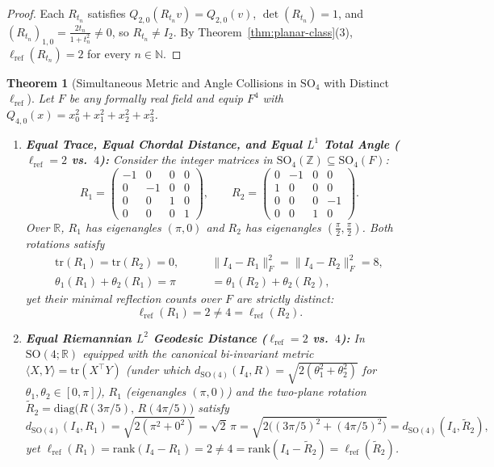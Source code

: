 \documentclass[11pt,a4paper]{article}
\theoremstyle{plain}
\newtheorem{theorem}{Theorem}[section]
\theoremstyle{definition}
\newcommand{\R}{\mathbb{R}}
\newcommand{\Z}{\mathbb{Z}}
\newcommand{\N}{\mathbb{N}}
\newcommand{\SO}{\mathrm{SO}}
\newcommand{\lref}{\ell_{\mathrm{ref}}}
\newcommand{\rk}{\mathrm{rank}}
\newcommand{\tr}{\mathrm{tr}}
\begin{document}
\begin{proof}
Each $R_{t_n}$ satisfies $Q_{2,0}(R_{t_n} v) = Q_{2,0}(v)$, $\det(R_{t_n}) = 1$, and $(R_{t_n})_{1,0} = \frac{2 t_n}{1 + t_n^2} \neq 0$, so $R_{t_n} \neq I_2$. By Theorem~\ref{thm:planar-class}(3), $\lref(R_{t_n}) = 2$ for every $n \in \N$.
\end{proof}

\begin{theorem}[Simultaneous Metric and Angle Collisions in $\SO_4$ with Distinct $\lref$]
\label{thm:so4-collision}
Let $F$ be any formally real field and equip $F^4$ with $Q_{4,0}(x) = x_0^2 + x_1^2 + x_2^2 + x_3^2$.
\begin{enumerate}
\item \textbf{Equal Trace, Equal Chordal Distance, and Equal $L^1$ Total Angle ($\lref = 2$ vs.\ $4$):} Consider the integer matrices in $\SO_4(\Z) \subseteq \SO_4(F)$:
\begin{equation}\label{eq:R1-R2}
  R_1 = \begin{pmatrix} -1 & 0 & 0 & 0 \\ 0 & -1 & 0 & 0 \\ 0 & 0 & 1 & 0 \\ 0 & 0 & 0 & 1 \end{pmatrix}, \qquad
  R_2 = \begin{pmatrix} 0 & -1 & 0 & 0 \\ 1 & 0 & 0 & 0 \\ 0 & 0 & 0 & -1 \\ 0 & 0 & 1 & 0 \end{pmatrix}.
\end{equation}
Over $\R$, $R_1$ has eigenangles $(\pi, 0)$ and $R_2$ has eigenangles $(\frac{\pi}{2}, \frac{\pi}{2})$. Both rotations satisfy
\begin{align*}
  \tr(R_1) = \tr(R_2) = 0, \qquad &\|I_4 - R_1\|_F^2 = \|I_4 - R_2\|_F^2 = 8,\\
  \theta_1(R_1) + \theta_2(R_1) = \pi &= \theta_1(R_2) + \theta_2(R_2),
\end{align*}
yet their minimal reflection counts over $F$ are strictly distinct:
\[
  \lref(R_1) = 2 \neq 4 = \lref(R_2).
\]
\item \textbf{Equal Riemannian $L^2$ Geodesic Distance ($\lref = 2$ vs.\ $4$):} In $\SO(4; \R)$ equipped with the canonical bi-invariant metric $\langle X, Y \rangle = \tr(X^\top Y)$ (under which $d_{\SO(4)}(I_4, R) = \sqrt{2(\theta_1^2 + \theta_2^2)}$ for $\theta_1, \theta_2 \in [0, \pi]$), $R_1$ (eigenangles $(\pi, 0)$) and the two-plane rotation $\widetilde{R}_2 = \mathrm{diag}\bigl(R(3\pi/5),\, R(4\pi/5)\bigr)$ satisfy
\[
  d_{\SO(4)}(I_4, R_1) = \sqrt{2(\pi^2 + 0^2)} = \sqrt{2}\,\pi = \sqrt{2\bigl((3\pi/5)^2 + (4\pi/5)^2\bigr)} = d_{\SO(4)}(I_4, \widetilde{R}_2),
\]
yet $\lref(R_1) = \rk(I_4 - R_1) = 2 \neq 4 = \rk(I_4 - \widetilde{R}_2) = \lref(\widetilde{R}_2)$.
\end{enumerate}
\end{theorem}
\end{document}
